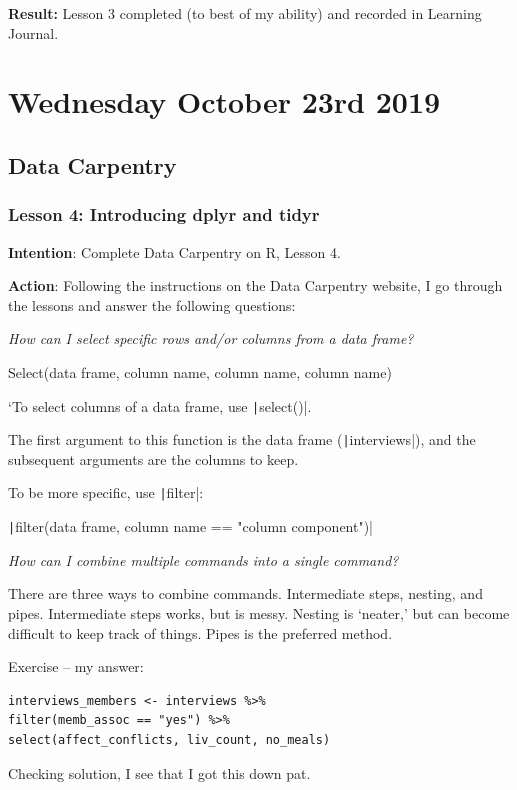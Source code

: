 \documentclass{article}
\begin{document}
\textbf{Result:} Lesson 3 completed (to best of my ability) and recorded in Learning Journal.

\newpage
\section{Wednesday October 23rd 2019}

\subsection{Data Carpentry}

\subsubsection{Lesson 4: Introducing dplyr and tidyr}

\textbf{Intention}: Complete Data Carpentry on R, Lesson 4.

\textbf{Action}: Following the instructions on the Data Carpentry website, I go through the lessons and answer the following questions:

\textit{How can I select specific rows and/or columns from a data frame?}

Select(data frame, column name, column name, column name)

`To select columns of a data frame, use \texttt|select()|.

The first argument to this function is the data frame (\texttt|interviews|), and the subsequent arguments are the columns to keep.

To be more specific, use \texttt|filter|:

\texttt|filter(data frame, column name == "column component")|

\textit{How can I combine multiple commands into a single command?}

There are three ways to combine commands.
Intermediate steps, nesting, and pipes.
Intermediate steps works, but is messy.
Nesting is ‘neater,’ but can become difficult to keep track of things.
Pipes is the preferred method.

Exercise – my answer: 

\begin{verbatim}
interviews_members <- interviews %>%
filter(memb_assoc == "yes") %>%
select(affect_conflicts, liv_count, no_meals)
\end{verbatim}

{\item Checking solution, I see that I got this down pat.}
\end{document}
